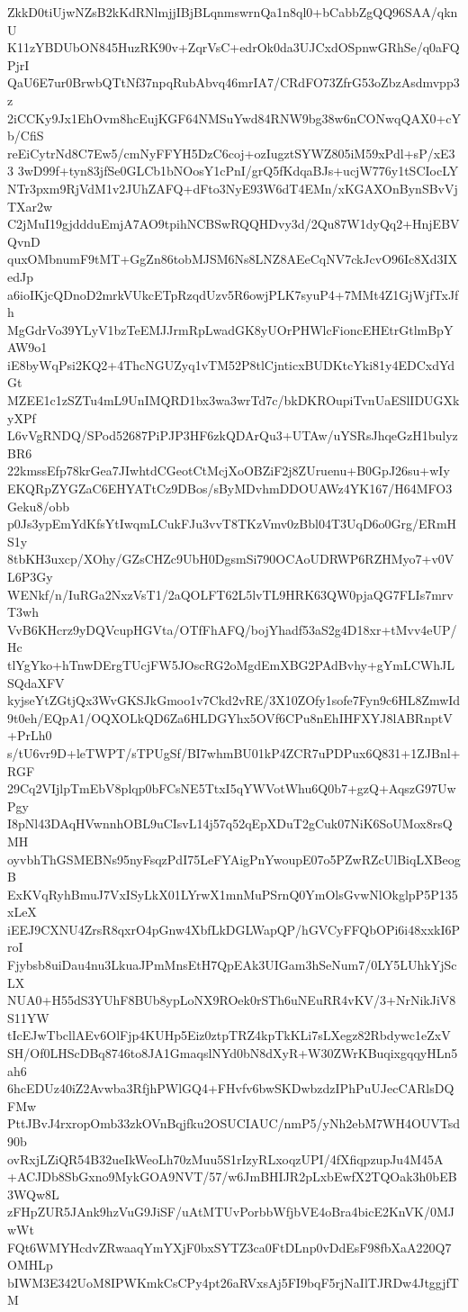 ZkkD0tiUjwNZsB2kKdRNlmjjIBjBLqnmswrnQa1n8ql0+bCabbZgQQ96SAA/qknU
K11zYBDUbON845HuzRK90v+ZqrVsC+edrOk0da3UJCxdOSpnwGRhSe/q0aFQPjrI
QaU6E7ur0BrwbQTtNf37npqRubAbvq46mrIA7/CRdFO73ZfrG53oZbzAsdmvpp3z
2iCCKy9Jx1EhOvm8hcEujKGF64NMSuYwd84RNW9bg38w6nCONwqQAX0+cYb/CfiS
reEiCytrNd8C7Ew5/cmNyFFYH5DzC6coj+ozIugztSYWZ805iM59xPdl+sP/xE33
3wD99f+tyn83jfSe0GLCb1bNOosY1cPnI/grQ5fKdqaBJs+ucjW776y1tSCIocLY
NTr3pxm9RjVdM1v2JUhZAFQ+dFto3NyE93W6dT4EMn/xKGAXOnBynSBvVjTXar2w
C2jMuI19gjddduEmjA7AO9tpihNCBSwRQQHDvy3d/2Qu87W1dyQq2+HnjEBVQvnD
quxOMbnumF9tMT+GgZn86tobMJSM6Ns8LNZ8AEeCqNV7ckJcvO96Ic8Xd3IXedJp
a6ioIKjcQDnoD2mrkVUkcETpRzqdUzv5R6owjPLK7syuP4+7MMt4Z1GjWjfTxJfh
MgGdrVo39YLyV1bzTeEMJJrmRpLwadGK8yUOrPHWlcFioncEHEtrGtlmBpYAW9o1
iE8byWqPsi2KQ2+4ThcNGUZyq1vTM52P8tlCjnticxBUDKtcYki81y4EDCxdYdGt
MZEE1c1zSZTu4mL9UnIMQRD1bx3wa3wrTd7c/bkDKROupiTvnUaESlIDUGXkyXPf
L6vVgRNDQ/SPod52687PiPJP3HF6zkQDArQu3+UTAw/uYSRsJhqeGzH1bulyzBR6
22kmssEfp78krGea7JIwhtdCGeotCtMcjXoOBZiF2j8ZUruenu+B0GpJ26su+wIy
EKQRpZYGZaC6EHYATtCz9DBos/sByMDvhmDDOUAWz4YK167/H64MFO3Geku8/obb
p0Js3ypEmYdKfsYtIwqmLCukFJu3vvT8TKzVmv0zBbl04T3UqD6o0Grg/ERmHS1y
8tbKH3uxcp/XOhy/GZsCHZc9UbH0DgsmSi790OCAoUDRWP6RZHMyo7+v0VL6P3Gy
WENkf/n/IuRGa2NxzVsT1/2aQOLFT62L5lvTL9HRK63QW0pjaQG7FLIs7mrvT3wh
VvB6KHcrz9yDQVcupHGVta/OTfFhAFQ/bojYhadf53aS2g4D18xr+tMvv4eUP/Hc
tlYgYko+hTnwDErgTUcjFW5JOscRG2oMgdEmXBG2PAdBvhy+gYmLCWhJLSQdaXFV
kyjseYtZGtjQx3WvGKSJkGmoo1v7Ckd2vRE/3X10ZOfy1sofe7Fyn9c6HL8ZmwId
9t0eh/EQpA1/OQXOLkQD6Za6HLDGYhx5OVf6CPu8nEhIHFXYJ8lABRnptV+PrLh0
s/tU6vr9D+leTWPT/sTPUgSf/BI7whmBU01kP4ZCR7uPDPux6Q831+1ZJBnl+RGF
29Cq2VIjlpTmEbV8plqp0bFCsNE5TtxI5qYWVotWhu6Q0b7+gzQ+AqszG97UwPgy
I8pNl43DAqHVwnnhOBL9uCIsvL14j57q52qEpXDuT2gCuk07NiK6SoUMox8rsQMH
oyvbhThGSMEBNs95nyFsqzPdI75LeFYAigPnYwoupE07o5PZwRZcUlBiqLXBeogB
ExKVqRyhBmuJ7VxISyLkX01LYrwX1mnMuPSrnQ0YmOlsGvwNlOkglpP5P135xLeX
iEEJ9CXNU4ZrsR8qxrO4pGnw4XbfLkDGLWapQP/hGVCyFFQbOPi6i48xxkI6ProI
Fjybsb8uiDau4nu3LkuaJPmMnsEtH7QpEAk3UIGam3hSeNum7/0LY5LUhkYjScLX
NUA0+H55dS3YUhF8BUb8ypLoNX9ROek0rSTh6uNEuRR4vKV/3+NrNikJiV8S11YW
tIcEJwTbcllAEv6OlFjp4KUHp5Eiz0ztpTRZ4kpTkKLi7sLXegz82Rbdywc1eZxV
SH/Of0LHScDBq8746to8JA1GmaqslNYd0bN8dXyR+W30ZWrKBuqixgqqyHLn5ah6
6hcEDUz40iZ2Avwba3RfjhPWlGQ4+FHvfv6bwSKDwbzdzIPhPuUJecCARlsDQFMw
PttJBvJ4rxropOmb33zkOVnBqjfku2OSUCIAUC/nmP5/yNh2ebM7WH4OUVTsd90b
ovRxjLZiQR54B32ueIkWeoLh70zMuu5S1rIzyRLxoqzUPI/4fXfiqpzupJu4M45A
+ACJDb8SbGxno9MykGOA9NVT/57/w6JmBHIJR2pLxbEwfX2TQOak3h0bEB3WQw8L
zFHpZUR5JAnk9hzVuG9JiSF/uAtMTUvPorbbWfjbVE4oBra4bicE2KnVK/0MJwWt
FQt6WMYHcdvZRwaaqYmYXjF0bxSYTZ3ca0FtDLnp0vDdEsF98fbXaA220Q7OMHLp
bIWM3E342UoM8IPWKmkCsCPy4pt26aRVxsAj5FI9bqF5rjNaIlTJRDw4JtggjfTM
